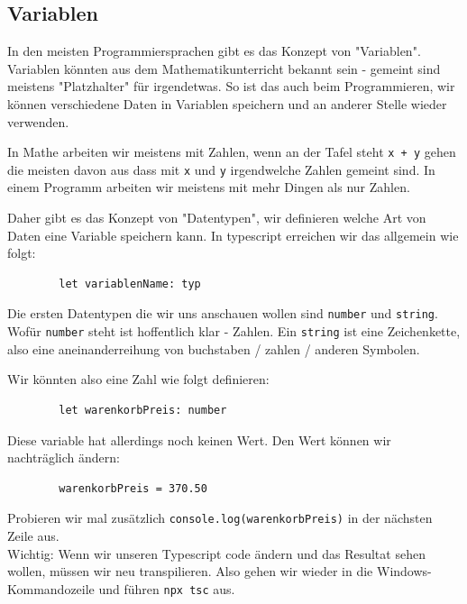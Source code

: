 \documentclass[11pt]{article}
\begin{document}
    \subsection{Variablen}

    In den meisten Programmiersprachen gibt es das Konzept von "Variablen".
    Variablen könnten aus dem Mathematikunterricht bekannt sein - gemeint sind meistens "Platzhalter" für irgendetwas.
    So ist das auch beim Programmieren, wir können verschiedene Daten in Variablen speichern und an anderer Stelle
    wieder verwenden.

    In Mathe arbeiten wir meistens mit Zahlen, wenn an der Tafel steht \Verb"x + y" gehen die meisten davon aus
    dass mit \Verb"x" und \Verb"y" irgendwelche Zahlen gemeint sind.
    In einem Programm arbeiten wir meistens mit mehr Dingen als nur Zahlen.

    Daher gibt es das Konzept von "Datentypen", wir definieren welche Art von Daten eine Variable speichern kann.
    In typescript erreichen wir das allgemein wie folgt:

    \begin{verbatim}
        let variablenName: typ
    \end{verbatim}

    Die ersten Datentypen die wir uns anschauen wollen sind \Verb"number" und \Verb"string".
    Wofür \Verb"number" steht ist hoffentlich klar - Zahlen.
    Ein \Verb"string" ist eine Zeichenkette, also eine aneinanderreihung von buchstaben / zahlen / anderen Symbolen.

    Wir könnten also eine Zahl wie folgt definieren:

    \begin{verbatim}
        let warenkorbPreis: number
    \end{verbatim}

    Diese variable hat allerdings noch keinen Wert.
    Den Wert können wir nachträglich ändern:

    \begin{verbatim}
        warenkorbPreis = 370.50
    \end{verbatim}

    Probieren wir mal zusätzlich \Verb"console.log(warenkorbPreis)" in der nächsten Zeile aus. \\

    Wichtig: Wenn wir unseren Typescript code ändern und das Resultat sehen wollen, müssen wir neu transpilieren.
    Also gehen wir wieder in die Windows-Kommandozeile und führen \Verb"npx tsc" aus.
\end{document}
